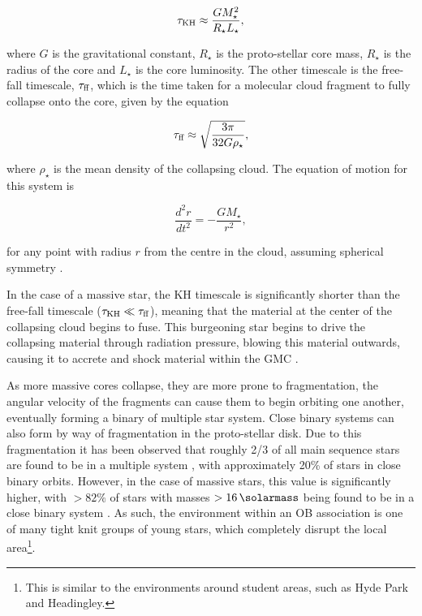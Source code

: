 \begin{equation}
  \label{eq:khtime}
  \tau_\text{KH} \approx \frac{G M_\star^2}{R_\star L_\star},  
\end{equation}

\noindent
where $G$ is the gravitational constant, $R_\star$ is the proto-stellar core mass, $R_\star$ is the radius of the core and $L_\star$ is the core luminosity.
The other timescale is the free-fall timescale, $\tau_\text{ff}$, which is the time taken for a molecular cloud fragment to fully collapse onto the core, given by the equation

\begin{equation}
  \label{eq:fftime}
  \tau_\text{ff} \approx \sqrt{\frac{3\pi}{32 G \rho_\star}} ,
\end{equation}

\noindent
where $\rho_\star$ is the mean density of the collapsing cloud.
The equation of motion for this system is

\begin{equation}
  \frac{d^2r}{dt^2} = - \frac{GM_\star}{r^2} ,
\end{equation}

\noindent
for any point with radius $r$ from the centre in the cloud, assuming spherical symmetry \parencite[96]{ward-thompsonIntroductionStarFormation2011}.

In the case of a massive star, the KH timescale is significantly shorter than the free-fall timescale ($\tau_\text{KH} \ll \tau_\text{ff}$), meaning that the material at the center of the collapsing cloud begins to fuse.
This burgeoning star begins to drive the collapsing material through radiation pressure, blowing this material outwards, causing it to accrete and shock material within the GMC \parencite[Ch.~5]{bodenheimerPrinciplesStarFormation2011}. 

As more massive cores collapse, they are more prone to fragmentation, the angular velocity of the fragments can cause them to begin orbiting one another, eventually forming a binary of multiple star system.
Close binary systems can also form by way of fragmentation in the proto-stellar disk.
Due to this fragmentation it has been observed that roughly 2/3 of all main sequence stars are found to be in a multiple system \parencite[113]{ward-thompsonIntroductionStarFormation2011}, with approximately 20\% of stars in close binary orbits.
However, in the case of massive stars, this value is significantly higher, with $>82\%$ of stars with masses $>\SI{16}{\solarmass}$ being found to be in a close binary system \parencite{chiniSpectroscopicSurveyMultiplicity2012}.
As such, the environment within an OB association is one of many tight knit groups of young stars, which completely disrupt the local area\footnote{This is similar to the environments around student areas, such as Hyde Park and Headingley.}.

